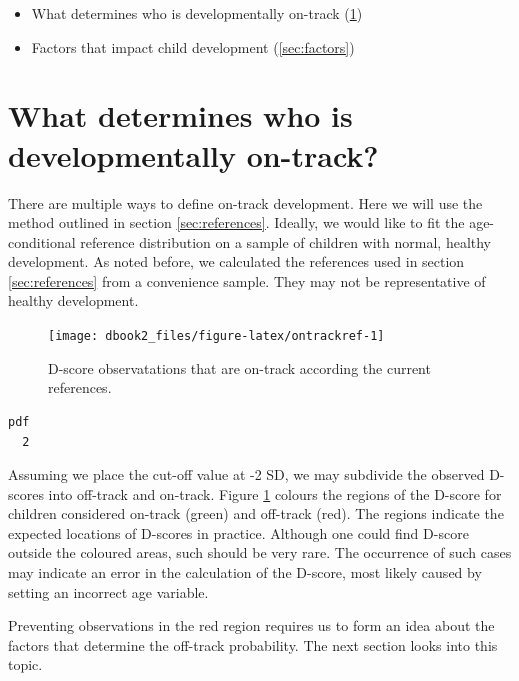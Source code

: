 \documentclass[
]{book}
\providecommand{\tightlist}{%
  \setlength{\itemsep}{0pt}\setlength{\parskip}{0pt}}
\begin{document}
\begin{itemize}
\tightlist
\item
  What determines who is developmentally on-track (\ref{sec:application2})
\item
  Factors that impact child development (\ref{sec:factors})
\end{itemize}

\hypertarget{sec:application2}{%
\section{What determines who is developmentally on-track?}\label{sec:application2}}

There are multiple ways to define on-track development. Here we will use the method outlined in section \ref{sec:references}. Ideally, we would like to fit the age-conditional reference distribution on a sample of children with normal, healthy development. As noted before, we calculated the references used in section \ref{sec:references} from a convenience sample. They may not be representative of healthy development.

\begin{figure}

{\centering \texttt{[image: dbook2\_files/figure-latex/ontrackref-1]} 

}

\caption{D-score observatations that are on-track according the current references.}\label{fig:ontrackref}
\end{figure}

\begin{verbatim}
pdf 
  2 
\end{verbatim}



Assuming we place the cut-off value at -2 SD, we may subdivide the observed D-scores into off-track and on-track. Figure \ref{fig:ontrackref} colours the regions of the D-score for children considered on-track (green) and off-track (red). The regions indicate the expected locations of D-scores in practice. Although one could find D-score outside the coloured areas, such should be very rare. The occurrence of such cases may indicate an error in the calculation of the D-score, most likely caused by setting an incorrect age variable.

Preventing observations in the red region requires us to form an idea about the factors that determine the off-track probability. The next section looks into this topic.
\end{document}
